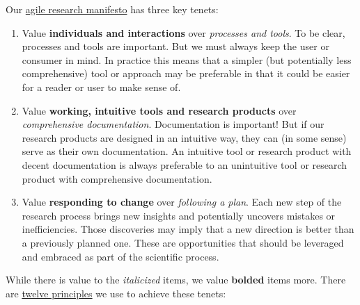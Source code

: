 \documentclass{tufte-book} %
\begin{document}
Our \href{http://agilemanifesto.org/}{agile research manifesto} has three key
tenets:
\begin{enumerate}
\item Value \textbf{individuals and interactions} over
  \textit{processes and tools}.  To be clear, processes and tools are
  important.  But we must always keep the user or consumer in mind.
  In practice this means that a simpler (but potentially less
  comprehensive) tool or approach may be preferable in that it could
  be easier for a reader or user to make sense of.
\item Value \textbf{working, intuitive tools and research products}
  over \textit{comprehensive documentation}.  Documentation is
  important!  But if our research products are designed in an
  intuitive way, they can (in some sense) serve as their own
  documentation.  An intuitive tool or research product with decent
  documentation is always preferable to an unintuitive tool or
  research product with comprehensive documentation.
\item Value \textbf{responding to change} over \textit{following a
    plan}.  Each new step of the research process brings new insights
  and potentially uncovers mistakes or inefficiencies.  Those
  discoveries may imply that a new direction is better than a
  previously planned one.  These are opportunities that should be
  leveraged and embraced as part of the scientific process.
\end{enumerate}
While there is value to the \textit{italicized} items, we value
\textbf{bolded} items more.  There are \href{http://www.agilemanifesto.org/principles.html}{twelve
  principles} we use to achieve these tenets:
\end{document}
